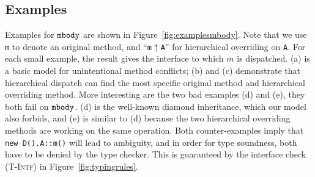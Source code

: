 \subsection{Examples}

Examples for $\texttt{mbody}$ are shown in Figure~\ref{fig:examplesmbody}. Note that we use \lstinline|m| to denote an original method, and ``\lstinline|m|$\uparrow$\lstinline|A|'' for hierarchical overriding on \lstinline|A|. For each small example, the result
gives the interface to which $m$ is dispatched. (a) is a basic model for unintentional method conflicts; (b) and (c) demonstrate
that hierarchical dispatch can find the most specific original method and hierarchical overriding method. More interesting are the two bad examples
(d) and (e), they both fail on $\texttt{mbody}$. (d) is the well-known diamond inheritance, which our model also forbids, and (e) is similar to
(d) because the two hierarchical overriding methods are working on the same operation. Both counter-examples imply that \lstinline|new D().A::m()| will
lead to ambiguity, and in order for type soundness, both have to be denied by the type checker. This is guaranteed by the interface check
\textsc{(T-Intf)} in Figure~\ref{fig:typingrules}.